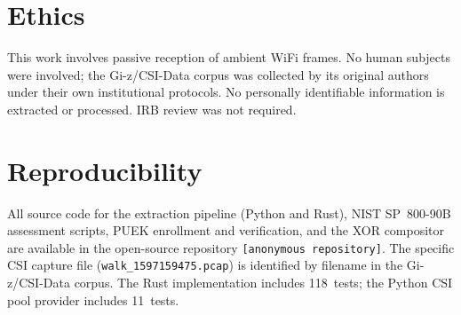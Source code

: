 \documentclass[sigconf,nonacm=false,anonymous]{acmart}
\begin{document}
\section*{Ethics}
This work involves passive reception of ambient WiFi frames.
No human subjects were involved; the Gi-z/CSI-Data corpus was collected by its original authors under their own institutional protocols.
No personally identifiable information is extracted or processed.
IRB review was not required.

\section*{Reproducibility}
All source code for the extraction pipeline (Python and Rust), NIST SP~800-90B assessment scripts, PUEK enrollment and verification, and the XOR compositor are available in the open-source repository \texttt{[anonymous repository]}.
The specific CSI capture file (\texttt{walk\_1597159475.pcap}) is identified by filename in the Gi-z/CSI-Data corpus.
The Rust implementation includes 118~tests; the Python CSI pool provider includes 11~tests.

\begin{acks}
\end{acks}



\end{document}
